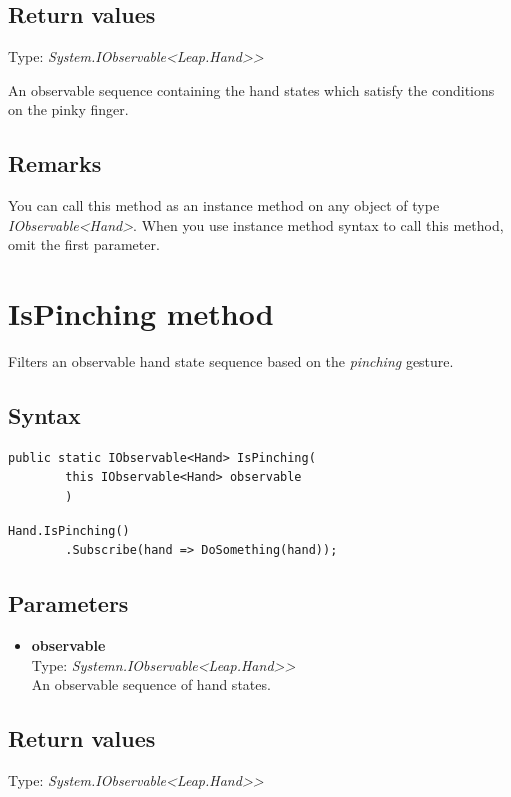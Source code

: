 \documentclass[12pt,a4paper,twoside]{report}
\begin{document}
\subsection{Return values}
Type: \textit{System.IObservable<Leap.Hand>{}>}

An observable sequence containing the hand states which satisfy the conditions on the pinky finger.

\subsection{Remarks}
You can call this method as an instance method on any object of type \textit{IObservable<Hand>}. When you use 
instance method syntax to call this method, omit the first parameter.

\newpage

\section{IsPinching method}
Filters an observable hand state sequence based on the \textit{pinching} gesture.

\subsection{Syntax}
\begin{lstlisting}[caption=Declaration]
    public static IObservable<Hand> IsPinching(
        this IObservable<Hand> observable
        )
\end{lstlisting}

\begin{lstlisting}[caption=Usage example]
    Hand.IsPinching()
        .Subscribe(hand => DoSomething(hand));
\end{lstlisting}

\subsection{Parameters}
\begin{itemize}
    \item \textbf{observable}\\
        Type: \textit{Systemn.IObservable<Leap.Hand>{}>}\\
        An observable sequence of hand states.
\end{itemize}

\subsection{Return values}
Type: \textit{System.IObservable<Leap.Hand>{}>}
\end{document}
